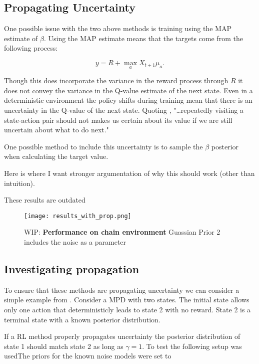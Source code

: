 \subsection{Propagating Uncertainty}

One possible issue with the two above methods is training using the MAP estimate of $\beta$. Using the MAP estimate means that the targets come from the following process:

$$
y = R + \max_a X_{t+1}\mu_a.
$$

Though this does incorporate the variance in the reward process through $R$ it does not convey the variance in the Q-value estimate of the next state. Even in a deterministic environment the policy shifts during training mean that there is an uncertainty in the Q-value of the next state. Quoting \cite{moerland_2017},  "\dots repeatedly visiting a state-action pair should not makes us certain about its value if we are still uncertain about what to do next."

One possible method to include this uncertainty is to sample the $\beta$ posterior when calculating the target value.

\todo Here is where I want stronger argumentation of why this should work (other than intuition).

\todo These results are outdated

\begin{figure}[H]
    \centering
    \texttt{[image: results\_with\_prop.png]}
    \caption{WIP: \textbf{Performance on chain environment} Guassian Prior 2 includes the noise as a parameter}
    \label{fig:results_no_propr}
\end{figure}

\subsection{Investigating propagation}

To ensure that these methods are propagating uncertainty we can consider a simple example from \cite{osband_2018}. Consider a MPD with two states. The initial state allows only one action that deterministicly leads to state 2 with no reward. State 2 is a terminal state with a known posterior distribution.

If a RL method properly propagates uncertainty the posterior distribution of state 1 should match state 2 as long as $\gamma=1$. To test the following setup was usedThe priors for the known noise models were set to

